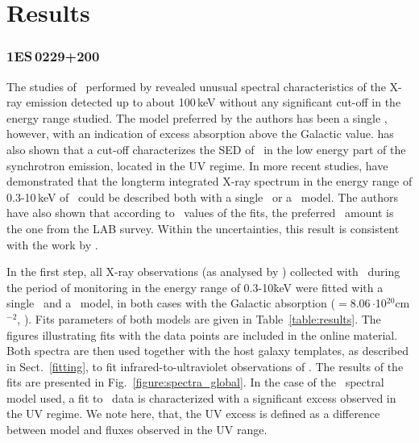 \section{Results} \label{results}

\subsubsection*{1ES\,0229+200}
The studies of \one\ performed by \cite{Kaufmann2011} revealed unusual spectral characteristics of the X-ray emission detected up to about 100\,keV without any significant cut-off in the energy range studied. 
The model preferred by the authors has been a single \po, however, with an indication of excess absorption above the Galactic value. 
\cite{Kaufmann2011} has also shown that a cut-off characterizes the SED of \one\ in the low energy part of the synchrotron emission, located in the UV regime. 
In more recent studies, \cite{Wierzcholska2016} have demonstrated that the longterm integrated X-ray spectrum in the energy range of 0.3-10\,keV of \one\ could be described both with a single \po\ or a \lp\ model.
The authors have also shown that according to \ch\ values of the fits, the preferred \nh\ amount is the one from the LAB survey.
Within the uncertainties, this result is consistent with the work by \cite{Kaufmann2011}.

In the first step, all X-ray observations (as analysed by \cite{Wierzcholska2016}) collected with \xrt\  during the period of monitoring in the energy range of 0.3-10\.keV were fitted with a single \po\ and a \lp\ model, in both cases with the Galactic absorption (\nh$=8.06$\,$\cdot$10$^{20}$cm$^{-2}$, \citealt{Kalberla2005}).
Fits parameters of both models are given in Table~\ref{table:results}. 
The figures illustrating fits with the data points are included in the online material. 
Both spectra are then used together with the host galaxy templates, as described in Sect.~\ref{fitting},  to fit infrared-to-ultraviolet observations of \one. 
The results of the fits are presented in Fig.~\ref{figure:spectra_global}. 
In the case of the \po\ spectral model used, a  fit to \itu\ data is characterized  with a significant excess  observed in the UV regime. 
 We note here, that, the UV excess is defined as a difference between model and fluxes observed in the UV range.



